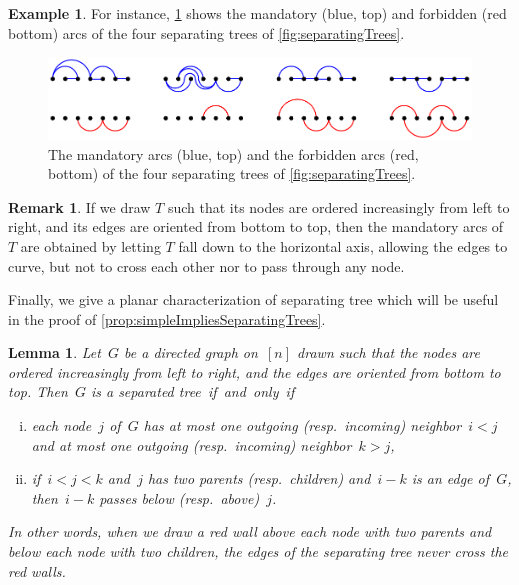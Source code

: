 \documentclass{amsart}
\newtheorem{lemma}[theorem]{Lemma}
\theoremstyle{definition}
\newtheorem{example}[theorem]{Example}
\newtheorem{remark}[theorem]{Remark}
\begin{document}
\begin{example}
For instance, \cref{fig:mandatoryForbiddenArcsSeparatingTrees} shows the mandatory (blue, top) and forbidden (red bottom) arcs of the four separating trees of \cref{fig:separatingTrees}.
\begin{figure}
	\capstart
	\centerline{\includegraphics[scale=.85]{mandatoryForbiddenArcsSeparatingTrees}}
	\caption{The mandatory arcs (blue, top) and the forbidden arcs (red, bottom) of the four separating trees of \cref{fig:separatingTrees}.}
	\label{fig:mandatoryForbiddenArcsSeparatingTrees}
\end{figure}
\end{example}

\begin{remark}
\label{rem:separatingTreeFallHorizontalAxis}
If we draw $T$ such that its nodes are ordered increasingly from left to right, and its edges are oriented from bottom to top, then the mandatory arcs of~$T$ are obtained by letting $T$ fall down to the horizontal axis, allowing the edges to curve, but not to cross each other nor to pass through any node.
\end{remark}

Finally, we give a planar characterization of separating tree which will be useful in the proof of \cref{prop:simpleImpliesSeparatingTrees}.

\begin{lemma}
\label{lem:separatingTree2}
Let~$G$ be a directed graph on~$[n]$ drawn such that the nodes are ordered increasingly from left to right, and the edges are oriented from bottom to top.
Then~$G$ is a separated tree~if~and~only~if
\begin{enumerate}[(i)]
\item each node~$j$ of~$G$ has at most one outgoing (resp.~incoming) neighbor~$i < j$ and at most one outgoing (resp.~incoming) neighbor~$k > j$,
\item if~$i < j < k$ and~$j$ has two parents (resp.~children) and~$i-k$ is an edge of~$G$, then~$i-k$ passes below (resp.~above)~$j$.
\end{enumerate}
In other words, when we draw a red wall above each node with two parents and below each node with two children, the edges of the separating tree never cross the red walls.
\end{lemma}
\end{document}

